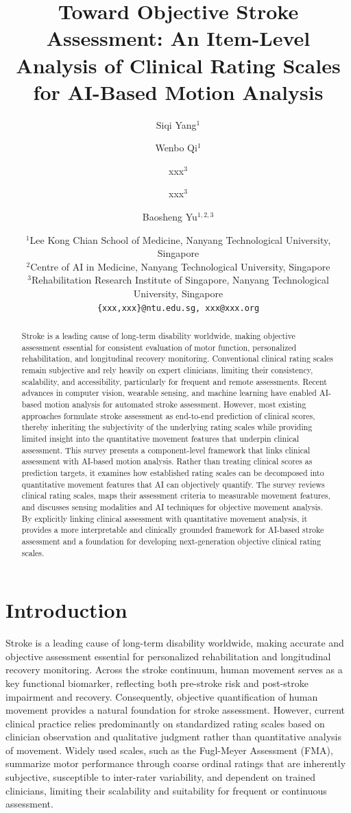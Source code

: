 \documentclass[11pt]{article}
\title{Toward Objective Stroke Assessment: An Item-Level Analysis of Clinical Rating Scales for AI-Based Motion Analysis}
\author{
    Siqi Yang$^{1}$ \and
    Wenbo Qi$^{1}$ \and
    xxx$^{3}$ \and
    xxx$^{3}$ \and
    Baosheng Yu$^{1,2,3}$
}
\date{
    $^{1}$Lee Kong Chian School of Medicine, Nanyang Technological University, Singapore \\
    $^{2}$Centre of AI in Medicine, Nanyang Technological University, Singapore\\
    $^{3}$Rehabilitation Research Institute of Singapore, Nanyang Technological University, Singapore \\[1ex]
    \texttt{\{xxx,xxx\}@ntu.edu.sg, xxx@xxx.org}
}
\begin{document}
\maketitle

\begin{abstract}
Stroke is a leading cause of long-term disability worldwide, making objective assessment essential for consistent evaluation of motor function, personalized rehabilitation, and longitudinal recovery monitoring. Conventional clinical rating scales remain subjective and rely heavily on expert clinicians, limiting their consistency, scalability, and accessibility, particularly for frequent and remote assessments. 
Recent advances in computer vision, wearable sensing, and machine learning have enabled AI-based motion analysis for automated stroke assessment. However, most existing approaches formulate stroke assessment as end-to-end prediction of clinical scores, thereby inheriting the subjectivity of the underlying rating scales while providing limited insight into the quantitative movement features that underpin clinical assessment.
This survey presents a component-level framework that links clinical assessment with AI-based motion analysis. Rather than treating clinical scores as prediction targets, it examines how established rating scales can be decomposed into quantitative movement features that AI can objectively quantify. The survey reviews clinical rating scales, maps their assessment criteria to measurable movement features, and discusses sensing modalities and AI techniques for objective movement analysis. By explicitly linking clinical assessment with quantitative movement analysis, it provides a more interpretable and clinically grounded framework for AI-based stroke assessment and a foundation for developing next-generation objective clinical rating scales.
\end{abstract}


\section{Introduction}

Stroke is a leading cause of long-term disability worldwide, making accurate and objective assessment essential for personalized rehabilitation and longitudinal recovery monitoring. Across the stroke continuum, human movement serves as a key functional biomarker, reflecting both pre-stroke risk and post-stroke impairment and recovery. Consequently, objective quantification of human movement provides a natural foundation for stroke assessment. However, current clinical practice relies predominantly on standardized rating scales based on clinician observation and qualitative judgment rather than quantitative analysis of movement. Widely used scales, such as the Fugl-Meyer Assessment (FMA), summarize motor performance through coarse ordinal ratings that are inherently subjective, susceptible to inter-rater variability, and dependent on trained clinicians, limiting their scalability and suitability for frequent or continuous assessment.
\end{document}
